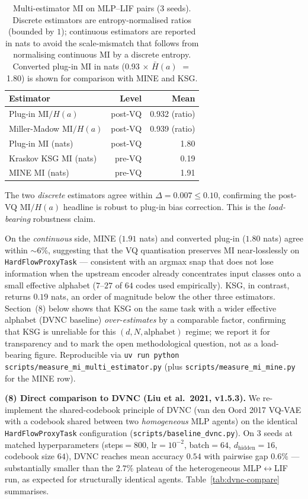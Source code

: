 \documentclass[10pt,twocolumn]{article}
\begin{document}
\begin{table}[t]
  \centering
  \caption{Multi-estimator MI on MLP--LIF pairs (3 seeds).
  Discrete estimators are entropy-normalised ratios (bounded by
  $1$); continuous estimators are reported in nats to avoid the
  scale-mismatch that follows from normalising continuous MI by
  a discrete entropy. Converted plug-in MI in nats (0.93 $\times$
  $\bar H(a)$ $=$ 1.80) is shown for comparison with MINE and KSG.}
  \label{tab:mi-multi}
  \small
  \begin{tabular}{lrr}
    \hline
    Estimator & Level & Mean \\
    \hline
    Plug-in $\mathrm{MI} / H(a)$      & post-VQ & 0.932 (ratio) \\
    Miller-Madow $\mathrm{MI} / H(a)$ & post-VQ & 0.939 (ratio) \\
    Plug-in MI (nats)                 & post-VQ & 1.80 \\
    Kraskov KSG MI (nats)             & pre-VQ  & 0.19 \\
    MINE MI (nats)                    & pre-VQ  & 1.91 \\
    \hline
  \end{tabular}
\end{table}

The two \emph{discrete} estimators agree within
$\Delta = 0.007 \leq 0.10$, confirming the post-VQ
$\mathrm{MI}/H(a)$ headline is robust to plug-in bias correction.
This is the \emph{load-bearing} robustness claim.

On the \emph{continuous} side, MINE ($1.91$ nats) and converted
plug-in ($1.80$ nats) agree within $\sim 6\%$, suggesting that the
VQ quantisation preserves MI near-losslessly on
\texttt{HardFlowProxyTask} --- consistent with an argmax snap
that does not lose information when the upstream encoder already
concentrates input classes onto a small effective alphabet ($7$--$27$
of $64$ codes used empirically). KSG, in contrast, returns $0.19$
nats, an order of magnitude below the other three estimators.
Section~(8) below shows that KSG on the same task with a wider
effective alphabet (DVNC baseline) \emph{over-estimates} by a
comparable factor, confirming that KSG is unreliable for this
\mbox{$(d, N, \text{alphabet})$} regime; we report it for
transparency and to mark the open methodological question, not as
a load-bearing figure. Reproducible via
\texttt{uv run python scripts/measure\_mi\_multi\_estimator.py}
(plus \texttt{scripts/measure\_mi\_mine.py} for the MINE row).

\textbf{(8) Direct comparison to DVNC (Liu et al.\ 2021,
v1.5.3).} We re-implement the shared-codebook principle of DVNC
(van den Oord 2017 VQ-VAE with a codebook shared between two
\emph{homogeneous} MLP agents) on the identical
\texttt{HardFlowProxyTask} configuration
(\texttt{scripts/baseline\_dvnc.py}). On 3 seeds at matched
hyperparameters (steps${=}800$, lr${=}10^{-2}$, batch${=}64$,
$d_{\mathrm{hidden}}{=}16$, codebook size $64$), DVNC reaches
mean accuracy $0.54$ with pairwise gap $0.6\%$ --- substantially
smaller than the $2.7\%$ plateau of the heterogeneous MLP$\leftrightarrow$LIF
run, as expected for structurally identical agents.
Table~\ref{tab:dvnc-compare} summarises.
\end{document}

